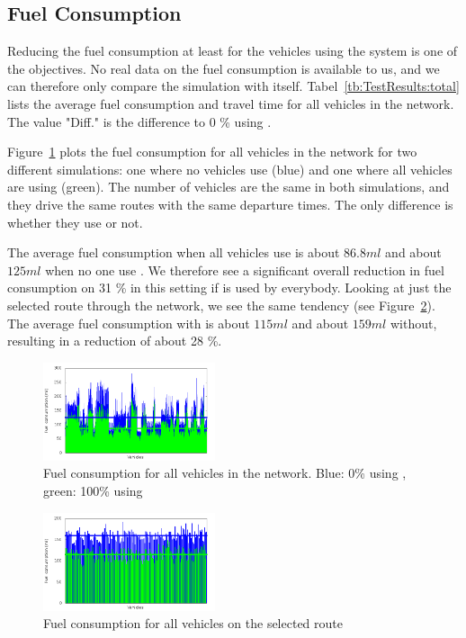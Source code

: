 \subsection{Fuel Consumption}
Reducing the fuel consumption at least for the vehicles using the system is one of the objectives.
No real data on the fuel consumption is available to us, and we can therefore only compare the simulation with itself. 
Tabel~\ref{tb:TestResults:total} lists the average fuel consumption and travel time for all vehicles in the network. 
The value "Diff." is the difference to 0 \% using \tech.

Figure~\ref{fig:TestResults:fuelTotal} plots the fuel consumption for all vehicles in the network for two different simulations: one where no vehicles use \tech (blue) and one where all vehicles are using \tech (green).
The number of vehicles are the same in both simulations, and they drive the same routes with the same departure times. 
The only difference is whether they use \tech or not.

The average fuel consumption when all vehicles use \tech is about $86.8 ml$ and about $125 ml$ when no one use \tech.
We therefore see a significant overall reduction in fuel consumption on 31 \% in this setting if \tech is used by everybody.
Looking at just the selected route through the network, we see the same tendency (see Figure~\ref{fig:TestResults:fuelRoute}). 
The average fuel consumption with \tech is about $115 ml$ and about $159 ml$ without, resulting in a reduction of about 28 \%.
\begin{figure}[htb]
\includegraphics[width=0.45\textwidth]{../images/tp0c0_8/fuelTotal.png}
\caption{Fuel consumption for all vehicles in the network. Blue: 0\% using \tech, green: 100\% using \tech}
\label{fig:TestResults:fuelTotal}
\end{figure}

\begin{figure}[htb]
\includegraphics[width=0.45\textwidth]{../images/tp0c0_8/fuelRoute.png}
\caption{Fuel consumption for all vehicles on the selected route}
\label{fig:TestResults:fuelRoute}
\end{figure}

